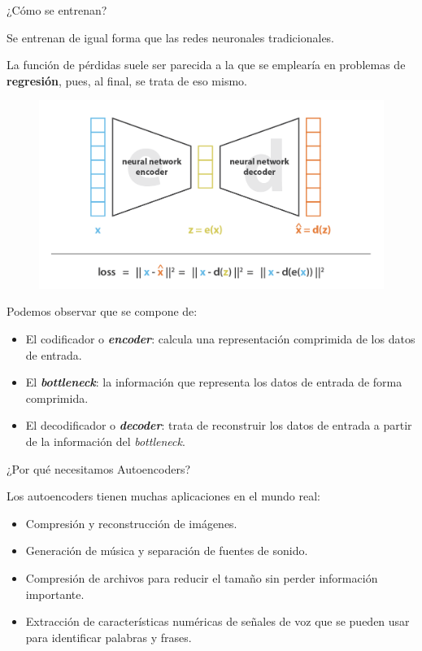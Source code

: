 \begin{frame}{¿Cómo se entrenan?}

Se entrenan de igual forma que las redes neuronales tradicionales.

La función de pérdidas suele ser parecida a la que se emplearía en problemas de \textbf{regresión}, pues, al final, se trata de eso mismo.

\begin{figure}
    \centering
    \includegraphics[width=.7\textwidth]{Slides/figures/02_Metodos_Generativos/cnn-ae-loss.png}
\end{figure}

Podemos observar que se compone de:
\begin{itemize}
    \item El codificador o \textit{\textbf{encoder}}: calcula una representación comprimida de los datos de entrada.
    \item El \textbf{\textit{bottleneck}}: la información que representa los datos de entrada de forma comprimida.
    \item El decodificador o \textit{\textbf{decoder}}: trata de reconstruir los datos de entrada a partir de la información del \textit{bottleneck}.
\end{itemize}
\end{frame}


\begin{frame}{¿Por qué necesitamos Autoencoders?}

Los autoencoders tienen muchas aplicaciones en el mundo real:

\begin{itemize}
    \item Compresión y reconstrucción de imágenes.
    \item Generación de música y separación de fuentes de sonido.
    \item Compresión de archivos para reducir el tamaño sin perder información importante.
    \item Extracción de características numéricas de señales de voz que se pueden usar para identificar palabras y frases.
\end{itemize}
\end{frame}


